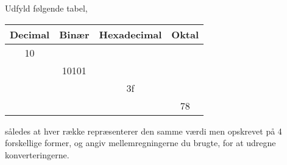 Udfyld følgende tabel,
  \begin{center}
    \begin{tabular}{|c|c|c|c|}
      \hline
      Decimal & Binær & Hexadecimal & Oktal\\
      \hline
              10 &  &  & \\
      \hline
              & 10101 &  & \\
      \hline
               &  & 3f  & \\
      \hline
              &  &  & 78 \\
      \hline
    \end{tabular}
  \end{center}
således at hver række repræsenterer den samme værdi men opskrevet på 4 forskellige former, og angiv mellemregningerne du brugte, for at udregne konverteringerne.
